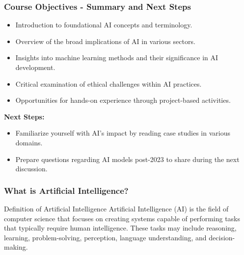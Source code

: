 \documentclass[aspectratio=169]{beamer}
\begin{document}
\begin{frame}[fragile]
    \frametitle{Course Objectives - Summary and Next Steps}
    \begin{itemize}
        \item Introduction to foundational AI concepts and terminology.
        \item Overview of the broad implications of AI in various sectors.
        \item Insights into machine learning methods and their significance in AI development.
        \item Critical examination of ethical challenges within AI practices.
        \item Opportunities for hands-on experience through project-based activities.
    \end{itemize}

    \textbf{Next Steps:}
    \begin{itemize}
        \item Familiarize yourself with AI's impact by reading case studies in various domains.
        \item Prepare questions regarding AI models post-2023 to share during the next discussion.
    \end{itemize}
\end{frame}

\begin{frame}[fragile]
    \frametitle{What is Artificial Intelligence?}
    \begin{block}{Definition of Artificial Intelligence}
    Artificial Intelligence (AI) is the field of computer science that focuses on creating systems capable of performing tasks that typically require human intelligence. These tasks may include reasoning, learning, problem-solving, perception, language understanding, and decision-making.
    \end{block}
\end{frame}
\end{document}
